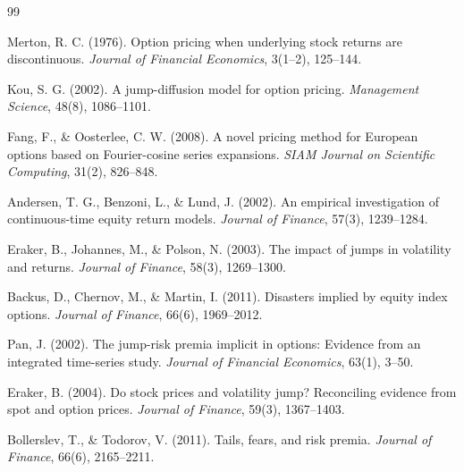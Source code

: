 \documentclass[11pt,a4paper]{article}
\begin{document}
\begin{thebibliography}{99}

Merton, R. C. (1976).
Option pricing when underlying stock returns are discontinuous.
\emph{Journal of Financial Economics}, 3(1--2), 125--144.

Kou, S. G. (2002).
A jump-diffusion model for option pricing.
\emph{Management Science}, 48(8), 1086--1101.

Fang, F., \& Oosterlee, C. W. (2008).
A novel pricing method for European options based on Fourier-cosine series expansions.
\emph{SIAM Journal on Scientific Computing}, 31(2), 826--848.

Andersen, T. G., Benzoni, L., \& Lund, J. (2002).
An empirical investigation of continuous-time equity return models.
\emph{Journal of Finance}, 57(3), 1239--1284.

Eraker, B., Johannes, M., \& Polson, N. (2003).
The impact of jumps in volatility and returns.
\emph{Journal of Finance}, 58(3), 1269--1300.

Backus, D., Chernov, M., \& Martin, I. (2011).
Disasters implied by equity index options.
\emph{Journal of Finance}, 66(6), 1969--2012.

Pan, J. (2002).
The jump-risk premia implicit in options: Evidence from an integrated time-series study.
\emph{Journal of Financial Economics}, 63(1), 3--50.

Eraker, B. (2004).
Do stock prices and volatility jump? Reconciling evidence from spot and option prices.
\emph{Journal of Finance}, 59(3), 1367--1403.

Bollerslev, T., \& Todorov, V. (2011).
Tails, fears, and risk premia.
\emph{Journal of Finance}, 66(6), 2165--2211.

\end{thebibliography}
\end{document}
